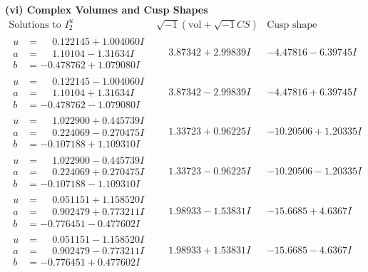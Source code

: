 \documentclass[1p]{elsarticle_modified}
\theoremstyle{definition}
\newcommand{\I}{\sqrt{-1}}
\begin{document}
\newpage\flushleft \textbf{(vi) Complex Volumes and Cusp Shapes}
$$\begin{array}{c|c|c}  
\text{Solutions to }I^u_{2}& \I (\text{vol} + \sqrt{-1}CS) & \text{Cusp shape}\\
 \hline 
\begin{aligned}
u &= \phantom{-}0.122145 + 1.004060 I \\
a &= \phantom{-}1.10104 - 1.31634 I \\
b &= -0.478762 + 1.079080 I\end{aligned}
 & \phantom{-}3.87342 + 2.99839 I & -4.47816 - 6.39745 I \\ \hline\begin{aligned}
u &= \phantom{-}0.122145 - 1.004060 I \\
a &= \phantom{-}1.10104 + 1.31634 I \\
b &= -0.478762 - 1.079080 I\end{aligned}
 & \phantom{-}3.87342 - 2.99839 I & -4.47816 + 6.39745 I \\ \hline\begin{aligned}
u &= \phantom{-}1.022900 + 0.445739 I \\
a &= \phantom{-}0.224069 - 0.270475 I \\
b &= -0.107188 + 1.109310 I\end{aligned}
 & \phantom{-}1.33723 + 0.96225 I & -10.20506 + 1.20335 I \\ \hline\begin{aligned}
u &= \phantom{-}1.022900 - 0.445739 I \\
a &= \phantom{-}0.224069 + 0.270475 I \\
b &= -0.107188 - 1.109310 I\end{aligned}
 & \phantom{-}1.33723 - 0.96225 I & -10.20506 - 1.20335 I \\ \hline\begin{aligned}
u &= \phantom{-}0.051151 + 1.158520 I \\
a &= \phantom{-}0.902479 + 0.773211 I \\
b &= -0.776451 - 0.477602 I\end{aligned}
 & \phantom{-}1.98933 - 1.53831 I & -15.6685 + 4.6367 I \\ \hline\begin{aligned}
u &= \phantom{-}0.051151 - 1.158520 I \\
a &= \phantom{-}0.902479 - 0.773211 I \\
b &= -0.776451 + 0.477602 I\end{aligned}
 & \phantom{-}1.98933 + 1.53831 I & -15.6685 - 4.6367 I \\ \hline\begin{aligned}

\end{aligned}
\end{array}$$
\end{document}
